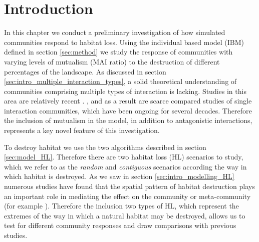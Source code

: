 \section{Introduction}
\label{sec:intro}

In this chapter we conduct a preliminary investigation of how simulated communities respond to habitat loss. Using the individual based model (IBM) defined in section \ref{sec:method} we study the response of communities with varying levels of mutualism (MAI ratio) to the destruction of different percentages of the landscape. As discussed in section \ref{sec:intro_multiple_interaction_types}, a solid theoretical understanding of communities comprising multiple types of interaction is lacking. Studies in this area are relatively recent \cite{sauve2014structure,fontaine2011ecological,kefi2012more,pocock2012robustness,mougi2012diversity,evans2013robustness}. , and as a result are scarce compared studies of single interaction communities, which have been ongoing for several decades. Therefore the inclusion of mutualism in the model, in addition to antagonistic interactions, represents a key novel feature of this investigation.  

To destroy habitat we use the two algorithms described in section \ref{sec:model_HL}. Therefore there are two habitat loss (HL) scenarios to study, which we refer to as the \emph{random} and \emph{contiguous} scenarios according the way in which habitat is destroyed. As we saw in section \ref{sec:intro_modelling_HL} numerous studies have found that the spatial pattern of habitat destruction plays an important role in mediating the effect on the community or meta-community (for example \cite{ovaskainen2002metapopulation,jager2006simulated,sole2006self}). Therefore the inclusion two types of HL, which represent the extremes of the way in which a natural habitat may be destroyed, allows us to test for different community responses and draw comparisons with previous studies. 

